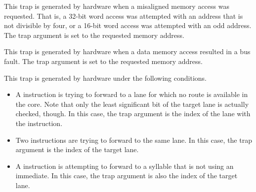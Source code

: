 
This trap is generated by hardware when a misaligned memory access was
requested. That is, a 32-bit word access was attempted with an address that is
not divisible by four, or a 16-bit word access was attempted with an odd
address. The trap argument is set to the requested memory address.



This trap is generated by hardware when a data memory access resulted in a bus
fault. The trap argument is set to the requested memory address.



This trap is generated by hardware under the following conditions.

\begin{itemize}

\item A  instruction is trying to forward to a lane for which no
route is available in the core. Note that only the least significant bit of the
target lane is actually checked, though. In this case, the trap argument is the
index of the lane with the  instruction.

\item Two  instructions are trying to forward to the same lane. In
this case, the trap argument is the index of the target lane.

\item A  instruction is attempting to forward to a syllable that
is not using an immediate. In this case, the trap argument is also the index of
the target lane.

\end{itemize}


\interrupt{}

